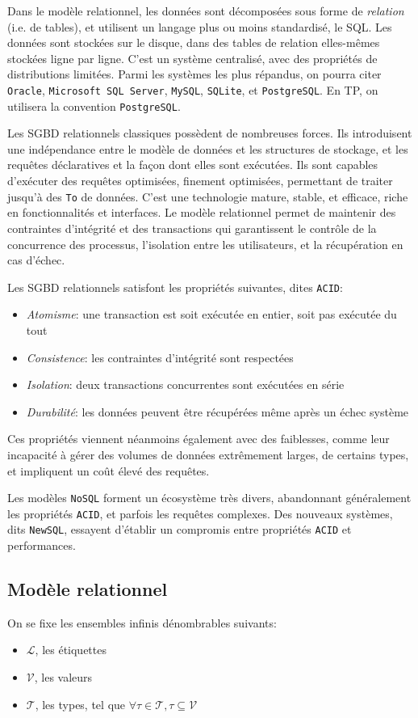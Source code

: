 \documentclass[french, toc]{../cs-classes/cs-classes}
\renewcommand*{\L}{\mathcal{L}}
\newcommand*{\V}{\mathcal{V}}
\newcommand*{\T}{\mathcal{T}}
\begin{document}
Dans le modèle relationnel, les données sont décomposées sous forme de \emph{relation} (i.e. de tables), et utilisent un langage plus ou moins standardisé, le SQL. Les données sont stockées sur le disque, dans des tables de relation elles-mêmes stockées ligne par ligne. C'est un système centralisé, avec des propriétés de distributions limitées. Parmi les systèmes les plus répandus, on pourra citer \texttt{Oracle}, \texttt{Microsoft SQL Server}, \texttt{MySQL}, \texttt{SQLite}, et \texttt{PostgreSQL}. En TP, on utilisera la convention \texttt{PostgreSQL}.

Les SGBD relationnels classiques possèdent de nombreuses forces. Ils introduisent une indépendance entre le modèle de données et les structures de stockage, et les requêtes déclaratives et la façon dont elles sont exécutées. Ils sont capables d'exécuter des requêtes optimisées, finement optimisées, permettant de traiter jusqu'à des \texttt{To} de données. C'est une technologie mature, stable, et efficace, riche en fonctionnalités et interfaces. Le modèle relationnel permet de maintenir des contraintes d'intégrité et des transactions qui garantissent le contrôle de la concurrence des processus, l'isolation entre les utilisateurs, et la récupération en cas d'échec.

Les SGBD relationnels satisfont les propriétés suivantes, dites \texttt{ACID}:
\begin{itemize}
    \item \emph{Atomisme}: une transaction est soit exécutée en entier, soit pas exécutée du tout
    \item \emph{Consistence}: les contraintes d'intégrité sont respectées
    \item \emph{Isolation}: deux transactions concurrentes sont exécutées en série
    \item \emph{Durabilité}: les données peuvent être récupérées même après un échec système
\end{itemize}
Ces propriétés viennent néanmoins également avec des faiblesses, comme leur incapacité à gérer des volumes de données extrêmement larges, de certains types, et impliquent un coût élevé des requêtes.

Les modèles \texttt{NoSQL} forment un écosystème très divers, abandonnant généralement les propriétés \texttt{ACID}, et parfois les requêtes complexes. Des nouveaux systèmes, dits \texttt{NewSQL}, essayent d'établir un compromis entre propriétés \texttt{ACID} et performances.

\subsection{Modèle relationnel}
On se fixe les ensembles infinis dénombrables suivants:
\begin{itemize}
    \item $\L$, les étiquettes
    \item $\V$, les valeurs
    \item $\T$, les types, tel que $\forall\tau\in\T, \tau\subseteq\V$
\end{itemize}
\end{document}
